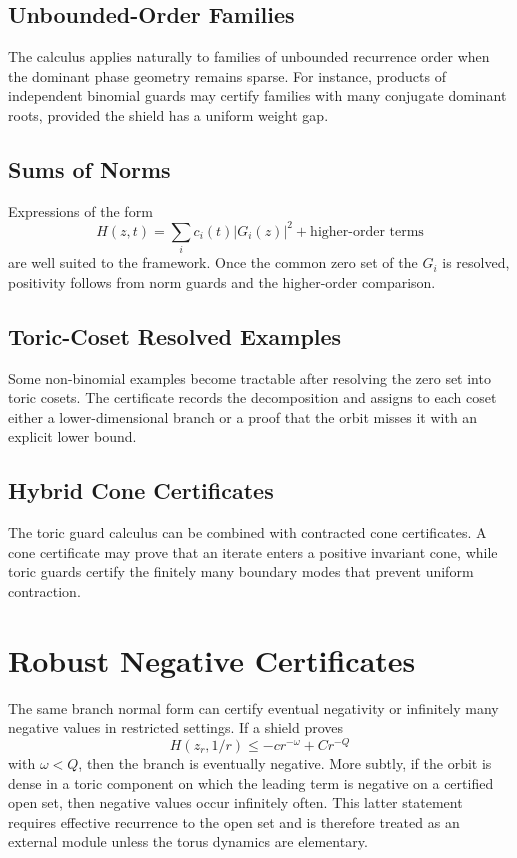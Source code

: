 \documentclass[11pt]{article}
\begin{document}
\subsection{Unbounded-Order Families}

The calculus applies naturally to families of unbounded recurrence order when the dominant phase geometry remains sparse. For instance, products of independent binomial guards may certify families with many conjugate dominant roots, provided the shield has a uniform weight gap.

\subsection{Sums of Norms}

Expressions of the form
\[
H(z,t)=\sum_i c_i(t)|G_i(z)|^2+\text{higher-order terms}
\]
are well suited to the framework. Once the common zero set of the \(G_i\) is resolved, positivity follows from norm guards and the higher-order comparison.

\subsection{Toric-Coset Resolved Examples}

Some non-binomial examples become tractable after resolving the zero set into toric cosets. The certificate records the decomposition and assigns to each coset either a lower-dimensional branch or a proof that the orbit misses it with an explicit lower bound.

\subsection{Hybrid Cone Certificates}

The toric guard calculus can be combined with contracted cone certificates. A cone certificate may prove that an iterate enters a positive invariant cone, while toric guards certify the finitely many boundary modes that prevent uniform contraction.

\section{Robust Negative Certificates}

The same branch normal form can certify eventual negativity or infinitely many negative values in restricted settings. If a shield proves
\[
H(z_r,1/r)\le -c r^{-\omega}+Cr^{-Q}
\]
with \(\omega<Q\), then the branch is eventually negative. More subtly, if the orbit is dense in a toric component on which the leading term is negative on a certified open set, then negative values occur infinitely often. This latter statement requires effective recurrence to the open set and is therefore treated as an external module unless the torus dynamics are elementary.
\end{document}
